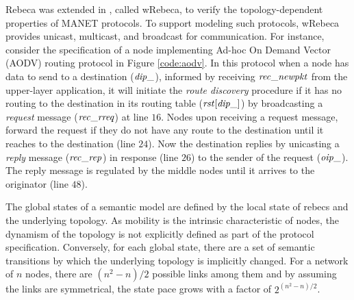 Rebeca was extended in \cite{FOAC}, called wRebeca, to verify the topology-dependent properties of MANET protocols. To support modeling such protocols, wRebeca provides unicast, multicast, and broadcast for communication. %
For instance, consider the specification of a node implementing Ad-hoc On Demand Vector (AODV) routing protocol \cite{AODV} in Figure \ref{code:aodv}. 
%
In this protocol when a node has data to send to a destination (${\it dip\_}$), informed by receiving ${\it rec\_newpkt}$ from the upper-layer application, it will initiate the \emph{route discovery} procedure if it has no routing to the destination in its routing table (${\it rst}[{\it dip\_}]$) by broadcasting a \emph{request} message (${\it rec\_rreq}$) at line $16$. 
%
Nodes upon receiving a request message, forward the request if they do not have any route to the destination until it reaches to the destination (line $24$). Now the destination replies by unicasting a \emph{reply} message (${\it rec\_rep}$) in response (line $26$) to the sender of the request (${\it oip\_}$). The reply message is regulated by the middle nodes until it arrives to the originator (line $48$).

\begin{figure*}
	\begin{center}
		
	\end{center}
	\caption{The AODV protocol specified by wRebeca \label{code:aodv}\cite{FOAC}}
\end{figure*} 

The global states of a semantic model
are defined by the local state of rebecs and the underlying topology. As mobility is the intrinsic characteristic of nodes, the dynamism of the topology is not explicitly defined as part of the protocol specification. Conversely, for each global state, there are a set of semantic transitions by which the underlying topology is implicitly changed.  For a network of $n$ nodes, there are $(n^2-n)/2$ possible links among them and by assuming the links are symmetrical, the state pace grows with a factor of $2^{(n^2-n)/2}$. 

